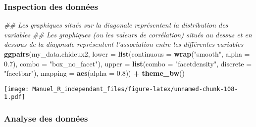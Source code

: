 \documentclass[
]{book}
\newenvironment{Shaded}{\begin{snugshade}}{\end{snugshade}}
\newcommand{\CommentTok}[1]{\textcolor[rgb]{0.56,0.35,0.01}{\textit{#1}}}
\newcommand{\DataTypeTok}[1]{\textcolor[rgb]{0.13,0.29,0.53}{#1}}
\newcommand{\FloatTok}[1]{\textcolor[rgb]{0.00,0.00,0.81}{#1}}
\newcommand{\KeywordTok}[1]{\textcolor[rgb]{0.13,0.29,0.53}{\textbf{#1}}}
\newcommand{\NormalTok}[1]{#1}
\newcommand{\OperatorTok}[1]{\textcolor[rgb]{0.81,0.36,0.00}{\textbf{#1}}}
\newcommand{\StringTok}[1]{\textcolor[rgb]{0.31,0.60,0.02}{#1}}
\begin{document}
\hypertarget{inspection-des-donnuxe9es-11}{%
\subsubsection{Inspection des données}\label{inspection-des-donnuxe9es-11}}

\begin{Shaded}
\begin{Highlighting}[]
\CommentTok{## Les graphiques situés sur la diagonale représentent la distribution des variables}
\CommentTok{## Les graphiques (ou les valeurs de corrélation) situés au dessus et en dessous de la diagonale représentent l'association entre les différentes variables}
\KeywordTok{ggpairs}\NormalTok{(my_data.chideux2,}
        \DataTypeTok{lower =} \KeywordTok{list}\NormalTok{(}\DataTypeTok{continuous =} \KeywordTok{wrap}\NormalTok{(}\StringTok{"smooth"}\NormalTok{, }\DataTypeTok{alpha =} \FloatTok{0.7}\NormalTok{), }\DataTypeTok{combo =} \StringTok{"box_no_facet"}\NormalTok{),}
        \DataTypeTok{upper =} \KeywordTok{list}\NormalTok{(}\DataTypeTok{combo =} \StringTok{"facetdensity"}\NormalTok{, }\DataTypeTok{discrete =} \StringTok{"facetbar"}\NormalTok{), }
        \DataTypeTok{mapping =} \KeywordTok{aes}\NormalTok{(}\DataTypeTok{alpha =} \FloatTok{0.8}\NormalTok{)) }\OperatorTok{+}\StringTok{ }\KeywordTok{theme_bw}\NormalTok{()}
\end{Highlighting}
\end{Shaded}

\texttt{[image: Manuel\_R\_independant\_files/figure-latex/unnamed-chunk-108-1.pdf]}

\hypertarget{analyse-des-donnuxe9es-12}{%
\subsubsection{Analyse des données}\label{analyse-des-donnuxe9es-12}}
\end{document}

